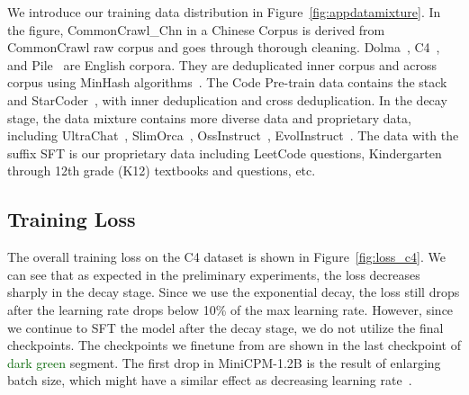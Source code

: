 We introduce our training data distribution in Figure~\ref{fig:appdatamixture}. In the figure, CommonCrawl\_Chn in a Chinese Corpus is derived from CommonCrawl raw corpus and goes through thorough cleaning. Dolma~\citep{dolma}, C4~\citep{2019t5}, and Pile~\citep{gao2020pile, biderman2022datasheet} are English corpora. They are deduplicated inner corpus and across corpus using MinHash algorithms~\citep{broder1997resemblance}. The Code Pre-train data contains the stack~\citep{Kocetkov2022TheStack} and StarCoder~\cite{li2023starcoder}, with inner deduplication and cross deduplication. In the decay stage, the data mixture contains more diverse data and proprietary data, including UltraChat~\citep{ding2023enhancing}, SlimOrca~\citep{SlimOrca, SlimOrcaDedup}, OssInstruct~\citep{wei2023magicoder}, EvolInstruct~\citep{xu2023wizardlm}. The data with the suffix SFT is our proprietary data including LeetCode questions, Kindergarten through 12th grade (K12) textbooks and questions, etc. 


\subsection{Training Loss}


The overall training loss on the C4 dataset is shown in Figure~\ref{fig:loss_c4}. We can see that as expected in the preliminary experiments, the loss decreases sharply in the decay stage. Since we use the exponential decay, the loss still drops after the learning rate drops below 10\% of the max learning rate. However, since we continue to SFT the model after the decay stage, we do not utilize the final checkpoints. The checkpoints we finetune from are shown in the last checkpoint of \textcolor{darkgreen}{dark green} segment. The first drop in MiniCPM-1.2B is the result of enlarging batch size, which might have a similar effect as decreasing learning rate~\citep{smith2017don}.





